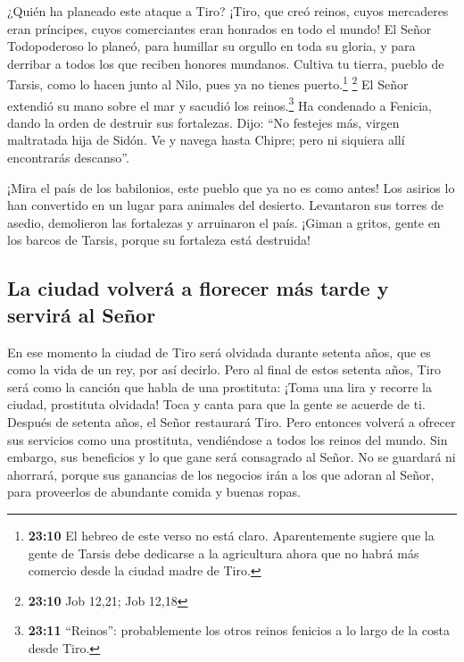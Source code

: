  ¿Quién ha planeado este ataque a Tiro? ¡Tiro, que creó
reinos, cuyos mercaderes eran príncipes, cuyos comerciantes eran
honrados en todo el mundo!  El Señor Todopoderoso lo
planeó, para humillar su orgullo en toda su gloria, y para derribar a
todos los que reciben honores mundanos.  Cultiva tu
tierra, pueblo de Tarsis, como lo hacen junto al Nilo, pues ya no tienes
puerto.\footnote{\textbf{23:10} El hebreo de este verso no está claro.
  Aparentemente sugiere que la gente de Tarsis debe dedicarse a la
  agricultura ahora que no habrá más comercio desde la ciudad madre de
  Tiro.} \footnote{\textbf{23:10} Job 12,21; Job 12,18} 
El Señor extendió su mano sobre el mar y sacudió los reinos.\footnote{\textbf{23:11}
  ``Reinos'': probablemente los otros reinos fenicios a lo largo de la
  costa desde Tiro.} Ha condenado a Fenicia, dando la orden de destruir
sus fortalezas.  Dijo: ``No festejes más, virgen
maltratada hija de Sidón. Ve y navega hasta Chipre; pero ni siquiera
allí encontrarás descanso''.

 ¡Mira el país de los babilonios, este pueblo que ya no
es como antes! Los asirios lo han convertido en un lugar para animales
del desierto. Levantaron sus torres de asedio, demolieron las fortalezas
y arruinaron el país.  ¡Giman a gritos, gente en los
barcos de Tarsis, porque su fortaleza está destruida!

\hypertarget{la-ciudad-volveruxe1-a-florecer-muxe1s-tarde-y-serviruxe1-al-seuxf1or}{%
\subsection{La ciudad volverá a florecer más tarde y servirá al
Señor}\label{la-ciudad-volveruxe1-a-florecer-muxe1s-tarde-y-serviruxe1-al-seuxf1or}}

 En ese momento la ciudad de Tiro será olvidada durante
setenta años, que es como la vida de un rey, por así decirlo. Pero al
final de estos setenta años, Tiro será como la canción que habla de una
prostituta:  ¡Toma una lira y recorre la ciudad,
prostituta olvidada! Toca y canta para que la gente se acuerde de ti.
 Después de setenta años, el Señor restaurará Tiro. Pero
entonces volverá a ofrecer sus servicios como una prostituta,
vendiéndose a todos los reinos del mundo.  Sin embargo,
sus beneficios y lo que gane será consagrado al Señor. No se guardará ni
ahorrará, porque sus ganancias de los negocios irán a los que adoran al
Señor, para proveerlos de abundante comida y buenas ropas.

